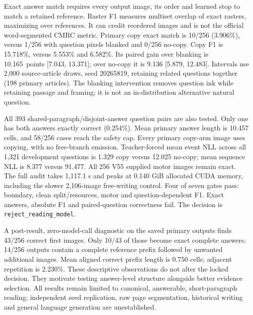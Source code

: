 \documentclass[10pt,a4paper]{article}
\newcommand{\QaExact}{3.906}
\newcommand{\QaFone}{15.718}
\newcommand{\QaBlankFone}{5.553}
\newcommand{\QaControlFone}{6.582}
\newcommand{\QaQuestionGain}{10.165}
\newcommand{\QaQuestionLow}{7.043}
\newcommand{\QaQuestionHigh}{13.371}
\newcommand{\QaPairExact}{0.254}
\newcommand{\QaDecision}{reject\_reading\_model}
\begin{document}
Exact answer match requires every output image, its order and learned stop to
match a retained reference. Raster F1 measures multiset overlap of exact
rasters, maximizing over references. It can credit reordered images and is
not the official word-segmented CMRC metric. Primary copy exact match is
10/256 (\QaExact\%), versus 1/256 with question pixels blanked and 0/256 no-copy. Copy F1 is
\QaFone\%, versus \QaBlankFone\% and \QaControlFone\%. Its paired gain over
blanking is \QaQuestionGain\ points [\QaQuestionLow, \QaQuestionHigh]; over
no-copy it is 9.136 [5.879, 12.483]. Intervals use 2,000 source-article draws,
seed 20265819, retaining related questions together (198 primary articles).
The blanking intervention removes question ink while retaining passage and
framing; it is not an in-distribution alternative natural question.

All 393 shared-paragraph/disjoint-answer question pairs are also tested.
Only one has both answers exactly correct (\QaPairExact\%). Mean primary
answer length is 10.457 cells, and 58/256 cases reach the safety cap.
Every primary copy-arm image uses copying, with no free-branch emission.
Teacher-forced mean event NLL across all 1,321 development questions is
1.329 copy versus 12.025 no-copy; mean sequence NLL is 8.377 versus 91.477.
All 256 V55 supplied motor images remain exact. The full audit takes
1,117.1 s and peaks at 0.140 GiB allocated CUDA memory, including the slower
2,106-image free-writing control. Four of seven gates pass: boundary, clean
split/resources, motor and question-dependent F1. Exact answers, absolute F1
and paired-question correctness fail. The decision is \texttt{\QaDecision}.

A post-result, zero-model-call diagnostic on the saved primary outputs finds
43/256 correct first images. Only 10/43 of those become exact complete answers;
14/256 outputs contain a complete reference prefix followed by unwanted
additional images. Mean aligned correct prefix length is 0.750 cells; adjacent
repetition is 2.230\%. These descriptive observations do not alter the locked
decision. They motivate testing answer-level structure alongside better
evidence selection. All results remain limited to canonical, answerable,
short-paragraph reading; independent seed replication, raw page segmentation,
historical writing and general language generation are unestablished.
\end{document}
